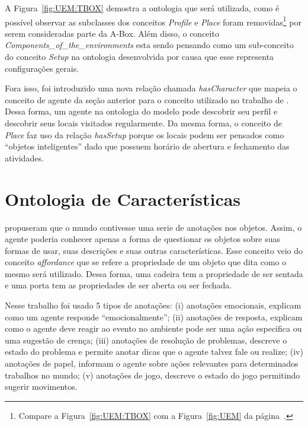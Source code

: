 A Figura~\ref{fig:UEM:TBOX} demostra a ontologia que será utilizada, como é
possível observar as subclasses dos conceitos \emph{Profile} e \emph{Place}
foram removidas\footnote{Compare a Figura~\ref{fig:UEM:TBOX} com a
Figura~\ref{fig:UEM} da página~\pageref{fig:UEM}.} por serem consideradas parte
da A-Box. Além disso, o conceito \emph{Components\_of\_the\_environments} esta
sendo pensando como um sub-conceito do conceito \emph{Setup} na ontologia
desenvolvida por causa que esse representa configurações gerais.

Fora isso, foi introduzido uma nova relação chamada \emph{hasCharacter} que
mapeia o conceito de agente da seção anterior para o conceito utilizado no
trabalho de \citet{paiva2005ontology}. Dessa forma, um agente na ontologia do
modelo \occ pode descobrir seu perfil e descobrir seus locais visitados
regularmente. Da mesma forma, o conceito de \emph{Place} faz uso da relação
\emph{hasSetup} porque os locais podem ser pensados como ``objetos
inteligentes'' dado que possuem horário de abertura e fechamento das
atividades.



\section{Ontologia de Características} \label{cap:tp:odp}

\citet{doyle1998annotated} propuseram que o mundo contivesse uma serie de
anotações nos objetos. Assim, o agente poderia conhecer apenas a forma de
questionar os objetos sobre suas formas de usar, suas descrições e suas outras
características. Esse conceito veio do conceito \emph{affordance} que se
refere a propriedade de um objeto que dita como o mesmo será utilizado.
Dessa forma, uma cadeira tem a propriedade de ser sentada e uma porta tem as
propriedades de ser aberta ou ser fechada.

Nesse trabalho foi usado 5 tipos de anotações: (i) anotações emocionais,
explicam como um agente responde ``emocionalmente''; (ii) anotações de
resposta, explicam como o agente deve reagir ao evento no ambiente pode ser
uma ação especifica ou uma sugestão de crença; (iii) anotações de resolução de
problemas, descreve o estado do problema  e permite anotar dicas que o agente
talvez fale ou realize; (iv) anotações de papel, informam o agente sobre ações
relevantes para determinados trabalhos no mundo; (v) anotações de jogo,
descreve o estado do jogo permitindo sugerir movimentos.

